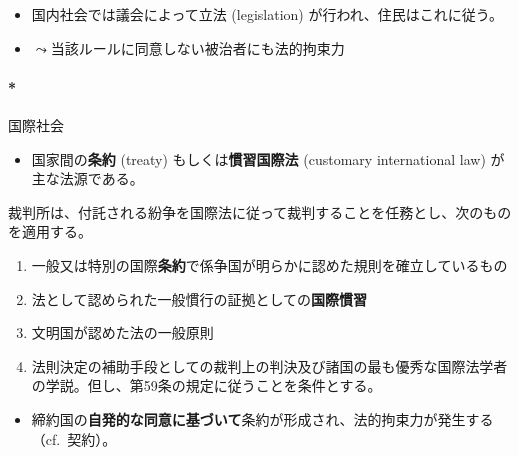 \documentclass[
  xelatex,
  ja=standard]{bxjsarticle}
\let\oldparagraph\paragraph
\renewcommand{\paragraph}[1]{\oldparagraph{#1}\mbox{}}
\providecommand{\tightlist}{%
  \setlength{\itemsep}{0pt}\setlength{\parskip}{0pt}}\usepackage{longtable,booktabs,array}
\begin{document}
\begin{itemize}
\tightlist
\item
  国内社会では議会によって立法 (legislation)
  が行われ、住民はこれに従う。
\item
  \(\leadsto\)当該ルールに同意しない被治者にも法的拘束力
\end{itemize}

\hypertarget{ux56fdux969bux793eux4f1a}{%
\paragraph*{国際社会}\label{ux56fdux969bux793eux4f1a}}

\begin{itemize}
\tightlist
\item
  国家間の\textbf{条約} (treaty) もしくは\textbf{慣習国際法} (customary
  international law) が主な法源である。
\end{itemize}

\begin{tcolorbox}[enhanced jigsaw, leftrule=.75mm, bottomrule=.15mm, left=2mm, toprule=.15mm, breakable, colbacktitle=quarto-callout-note-color!10!white, opacitybacktitle=0.6, bottomtitle=1mm, toptitle=1mm, colback=white, titlerule=0mm, arc=.35mm, title=\textcolor{quarto-callout-note-color}{\faInfo}\hspace{0.5em}{\href{https://www.unic.or.jp/info/un/un_organization/icj/statute/}{国際司法裁判所規程}　第38条1項}, opacityback=0, colframe=quarto-callout-note-color-frame, coltitle=black, rightrule=.15mm]

裁判所は、付託される紛争を国際法に従って裁判することを任務とし、次のものを適用する。

\begin{enumerate}
\def\labelenumi{\alph{enumi}.}
\tightlist
\item
  一般又は特別の国際\textbf{条約}で係争国が明らかに認めた規則を確立しているもの
\item
  法として認められた一般慣行の証拠としての\textbf{国際慣習}
\item
  文明国が認めた法の一般原則
\item
  法則決定の補助手段としての裁判上の判決及び諸国の最も優秀な国際法学者の学説。但し、第59条の規定に従うことを条件とする。
\end{enumerate}

\end{tcolorbox}

\begin{itemize}
\tightlist
\item
  締約国の\textbf{自発的な同意に基づいて}条約が形成され、法的拘束力が発生する（cf.~契約）。
\end{itemize}
\end{document}
